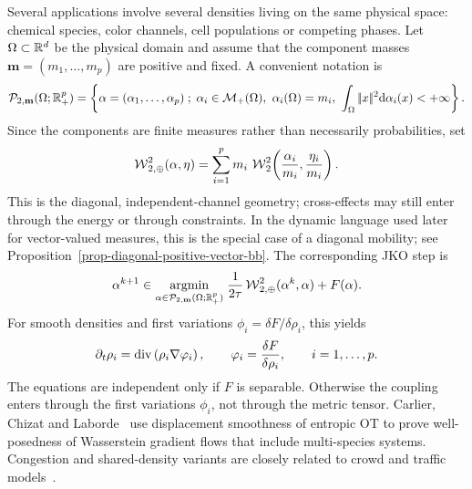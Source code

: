 Several applications involve several densities living on the same physical space: chemical species, color channels, cell populations or competing phases. Let $\Omega\subset\mathbb{R}^d$ be the physical domain and assume that the component masses $\mathbf m=(m_1,\ldots,m_p)$ are positive and fixed. A convenient notation is
\begin{equation}\label{eq-multispecies-space}
	\Pp_{2,\mathbf m}(\Omega;\RR_+^p)=
	\enscond{\alpha=(\alpha_1,\ldots,\alpha_p)}
	{\alpha_i\in\Mm_+(\Omega),\ \alpha_i(\Omega)=m_i,\ \int_\Omega\norm{x}^2\d\alpha_i(x)<+\infty}.
\end{equation}
Since the components are finite measures rather than necessarily probabilities, set
\begin{equation}\label{eq-multispecies-product-metric}
	\operatorname{\mathcal{W}}_{2,\oplus}^2(\alpha,\eta)=
	\sum_{i=1}^p m_i\,
	\operatorname{\mathcal{W}}_2^2\!\left(\frac{\alpha_i}{m_i},\frac{\eta_i}{m_i}\right).
\end{equation}
This is the diagonal, independent-channel geometry; cross-effects may still enter through the energy or through constraints. In the dynamic language used later for vector-valued measures, this is the special case of a diagonal mobility; see Proposition~\ref{prop-diagonal-positive-vector-bb}. The corresponding JKO step is
\begin{equation}\label{eq-multispecies-jko}
	\alpha^{k+1}
	\in
	\underset{\alpha\in\mathcal{P}_{2,\mathbf m}(\Omega;\mathbb{R}_+^p)}{\operatorname{argmin}}\;
	\frac{1}{2\tau}\operatorname{\mathcal{W}}_{2,\oplus}^2(\alpha^k,\alpha)+F(\alpha).
\end{equation}
For smooth densities and first variations $\phi_i=\delta F/\delta\rho_i$, this yields
\begin{equation}\label{eq-multispecies-pde}
	\partial_t\rho_i=\operatorname{div}\left(\rho_i\nabla\varphi_i\right),
	\qquad
	\varphi_i=\frac{\delta F}{\delta\rho_i},
	\qquad i=1,\ldots,p.
\end{equation}
The equations are independent only if $F$ is separable. Otherwise the coupling enters through the first variations $\phi_i$, not through the metric tensor. Carlier, Chizat and Laborde~\cite{CarlierChizatLabordeDisplacementSmoothness} use displacement smoothness of entropic OT to prove well-posedness of Wasserstein gradient flows that include multi-species systems. Congestion and shared-density variants are closely related to crowd and traffic models~\cite{maury2010macroscopic,CarlierSantambrogioOTCongestion2008,SantambrogioCrowdReview}.

